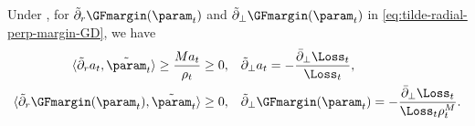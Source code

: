 \begin{lemma}
\label{lem:Decomposition of tilde subdifferential}
Under , for $\tilde \partial_r \GFmargin(\param_t)$ and $\tilde \partial_\perp \GFmargin(\param_t)$ in \eqref{eq:tilde-radial-perp-margin-GD}, we have 
\begin{align}
\label{eq:tilde-radial-perp-margin-GD-2}
\langle \tilde \partial_r a_t, \tilde \param_t \rangle \ge \frac{M a_t}{ \rho_t}  \ge 0 , &\quad \tilde \partial_\perp a_t  = - \frac{ \bar \partial_\perp \Loss_t}{\Loss_t}, \\ 
\langle \tilde \partial_r \GFmargin(\param_t), \tilde \param_t \rangle  \ge 0 , &\quad \tilde \partial_\perp \GFmargin(\param_t)  = - \frac{ \bar \partial_\perp \Loss_t}{\Loss_t \rho_t^M}. 
\end{align}

\end{lemma}

